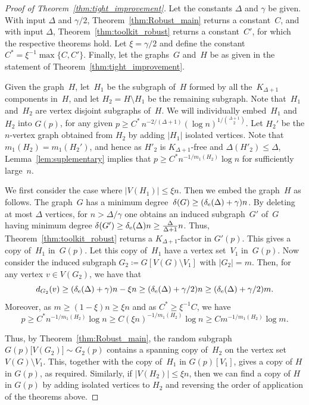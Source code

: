 \documentclass[final]{article}
\theoremstyle{definition}
\newcommand{\exth}{\delta_{\rm e}(\Delta)}
\begin{document}
\begin{proof}[Proof of Theorem~\ref{thm:tight_improvement}]
    
    Let the constants $\Delta$ and $\gamma$ be given. With input $\Delta$ and $\gamma/2$, Theorem~\ref{thm:Robust_main} returns a constant~$C$, and with input $\Delta$, Theorem~\ref{thm:toolkit_robust} returns a constant~$C'$, for which the respective theorems hold. Let $\xi = \gamma/2$ and define the constant $C^* = \xi^{-1} \max \{C, C'\}$. Finally, let the graphs~$G$ and~$H$ be as given in the statement of Theorem~\ref{thm:tight_improvement}.

    Given the graph~$H$, let~$H_1$ be the subgraph of~$H$ formed by all the~$K_{\Delta+1}$ components in~$H$, and let $H_2 = H \setminus H_1$ be the remaining subgraph. Note that~$H_1$ and~$H_2$ are vertex disjoint subgraphs of~$H$. We will individually embed~$H_1$ and~$H_2$ into $G(p)$, for any given $p \geq C^*\, n^{-2/(\Delta+1)}(\log n)^{1/\binom{\Delta+1}{2}}$. Let $H_2'$ be the $n$-vertex graph obtained from $H_2$ by adding $|H_1|$ isolated vertices. Note that $m_1(H_2) = m_1(H_2')$, and hence as $H'_2$ is $K_{\Delta+1}$-free and $\Delta(H'_2) \leq \Delta$, Lemma~\ref{lem:suplementary} implies that $p \geq C^* n^{-1/m_1(H_2)} \log n$ for sufficiently large~$n$. 

    We first consider the case where $|V(H_1)| \leq \xi n$. Then we embed the graph~$H$ as follows. The graph~$G$ has a minimum degree~$\delta(G) \geq (\exth + \gamma)n$. By deleting at most $\Delta$ vertices, for $n > \Delta/\gamma$ one obtains an induced subgraph~$G'$ of~$G$ having minimum degree $\delta(G') \geq \exth n \geq \frac{\Delta}{\Delta+1}n$. Thus, Theorem~\ref{thm:toolkit_robust} returns a $K_{\Delta+1}$-factor in $G'(p)$. This gives a copy of~$H_1$ in~$G(p)$. Let this copy of~$H_1$ have a vertex set~$V_1$ in~$G(p)$. Now consider the induced subgraph $G_2 \coloneqq G[V(G) \setminus V_1]$ with $|G_2| = m$. Then, for any vertex $v \in V(G_2)$, we have that 
    $$d_{G_2}(v) \geq (\exth + \gamma)n - \xi n \geq (\exth + \gamma/2) n \geq (\exth + \gamma/2) m.$$ 
    Moreover, as $m \geq (1-\xi)n \geq \xi n $ and as $C^* \geq \xi^{-1}C$, we have
    \[p \geq C^* n^{-1/m_1(H_2)} \log n \geq C(\xi n)^{-1/m_1(H_2)}\log n \geq Cm^{-1/m_1(H_2)}\log m.\]
    
    Thus, by Theorem~\ref{thm:Robust_main}, the random subgraph $G(p)\bigl[V(G_2)\bigr] \sim G_2(p)$ contains a spanning copy of~$H_2$ on the vertex set~$V(G)\setminus V_1$. This, together with the copy of~$H_1$ in $G(p)[V_1]$, gives a copy of $H$ in $G(p)$, as required. Similarly, if $|V(H_2)| \leq \xi n$, then we can find a copy of $H$ in $G(p)$ by adding isolated vertices to $H_2$ and reversing the order of application of the theorems above. 


\end{proof}
\end{document}
